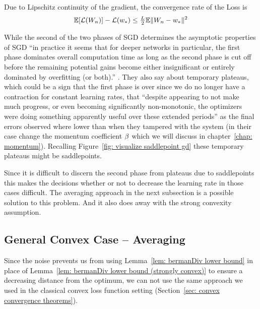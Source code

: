 Due to Lipschitz continuity of the gradient, the convergence rate of the Loss is
\begin{align*}
	\mathbb{E}[\mathcal{L}(W_n)]- \mathcal{L}(w_*) \le \tfrac{L}{2}\mathbb{E}\|W_n-w_*\|^2
\end{align*}

While the second of the two phases of SGD \parencite[first observed
by][]{darkenFasterStochasticGradient1991} determines the asymptotic properties
of SGD  ``in practice it seems that for deeper networks in particular, the first
phase dominates overall computation time as long as the second phase is cut off
before the remaining potential gains become either insignificant or entirely
dominated by overfitting (or both).''  
\parencite{sutskeverImportanceInitializationMomentum2013}. They also say about
temporary plateaus, which could be a sign that the first phase is over since
we do no longer have a contraction for constant learning rates, that 
``despite appearing to not make much progress, or even becoming significantly
non-monotonic, the optimizers were doing something apparently useful over these
extended periods'' as the final errors observed where lower than when they
tampered with the system (in their case change the momentum coefficient
\(\beta\) which we will discuss in chapter~\ref{chap: momentum}).
Recalling Figure~\ref{fig: visualize saddlepoint gd} these temporary plateaus
might be saddlepoints.

Since it is difficult to discern the second phase from plateaus due to saddlepoints
this makes the decisions whether or not to decrease the learning rate in those
cases difficult. The averaging approach in the next subsection is a possible
solution to this problem. And it also does away with the strong convexity
assumption.

\subsection{General Convex Case -- Averaging}\label{subsec: SGD with Averaging}

Since the noise prevents us from using Lemma~\ref{lem: bermanDiv lower bound} in
place of Lemma~\ref{lem: bermanDiv lower bound (strongly convex)} to ensure a
decreasing distance from the optimum, we can not use the same approach we used
in the classical convex loss function setting (Section~\ref{sec: convex convergence theorems}).

